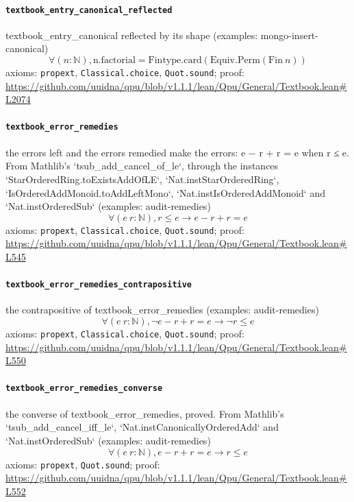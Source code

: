 \documentclass[11pt]{article}
\begin{document}
\paragraph{\texttt{textbook\_entry\_canonical\_reflected}}
textbook\_entry\_canonical reflected by its shape (examples: mongo-insert-canonical)
\[ \forall (n : \mathbb{N}), \mathrm{n.factorial} = \mathrm{Fintype.card} (\mathrm{Equiv.Perm} (\mathrm{Fin}\ n)) \]
\noindent axioms: \texttt{propext}, \texttt{Classical.choice}, \texttt{Quot.sound}; proof: \url{https://github.com/uuidna/qpu/blob/v1.1.1/lean/Qpu/General/Textbook.lean\#L2074}

\paragraph{\texttt{textbook\_error\_remedies}}
the errors left and the errors remedied make the errors: e − r + r = e when r ≤ e. From Mathlib's `tsub\_add\_cancel\_of\_le`, through the instances `StarOrderedRing.toExistsAddOfLE`, `Nat.instStarOrderedRing`, `IsOrderedAddMonoid.toAddLeftMono`, `Nat.instIsOrderedAddMonoid` and `Nat.instOrderedSub` (examples: audit-remedies)
\[ \forall (e\ r : \mathbb{N}), r \le e \to e - r + r = e \]
\noindent axioms: \texttt{propext}, \texttt{Classical.choice}, \texttt{Quot.sound}; proof: \url{https://github.com/uuidna/qpu/blob/v1.1.1/lean/Qpu/General/Textbook.lean\#L545}

\paragraph{\texttt{textbook\_error\_remedies\_contrapositive}}
the contrapositive of textbook\_error\_remedies (examples: audit-remedies)
\[ \forall (e\ r : \mathbb{N}), \neg e - r + r = e \to \neg r \le e \]
\noindent axioms: \texttt{propext}, \texttt{Classical.choice}, \texttt{Quot.sound}; proof: \url{https://github.com/uuidna/qpu/blob/v1.1.1/lean/Qpu/General/Textbook.lean\#L550}

\paragraph{\texttt{textbook\_error\_remedies\_converse}}
the converse of textbook\_error\_remedies, proved. From Mathlib's `tsub\_add\_cancel\_iff\_le`, `Nat.instCanonicallyOrderedAdd` and `Nat.instOrderedSub` (examples: audit-remedies)
\[ \forall (e\ r : \mathbb{N}), e - r + r = e \to r \le e \]
\noindent axioms: \texttt{propext}, \texttt{Quot.sound}; proof: \url{https://github.com/uuidna/qpu/blob/v1.1.1/lean/Qpu/General/Textbook.lean\#L552}
\end{document}

